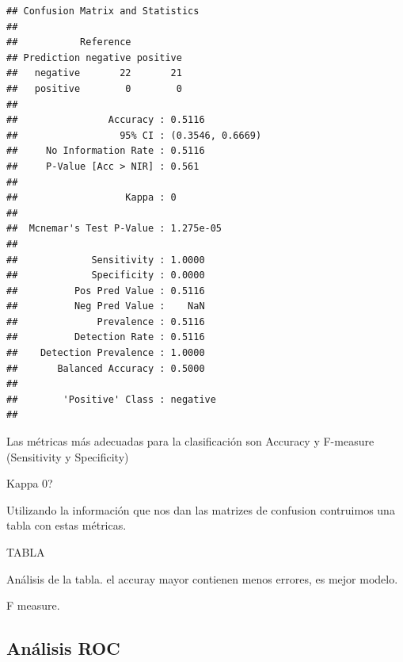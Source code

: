 \documentclass[]{article}
\newenvironment{Shaded}{\begin{snugshade}}{\end{snugshade}}
\newcommand{\DataTypeTok}[1]{\textcolor[rgb]{0.13,0.29,0.53}{#1}}
\newcommand{\KeywordTok}[1]{\textcolor[rgb]{0.13,0.29,0.53}{\textbf{#1}}}
\newcommand{\NormalTok}[1]{#1}
\newcommand{\OperatorTok}[1]{\textcolor[rgb]{0.81,0.36,0.00}{\textbf{#1}}}
\newcommand{\StringTok}[1]{\textcolor[rgb]{0.31,0.60,0.02}{#1}}
\begin{document}
\begin{Shaded}
\end{Shaded}

\begin{verbatim}
## Confusion Matrix and Statistics
## 
##           Reference
## Prediction negative positive
##   negative       22       21
##   positive        0        0
##                                           
##                Accuracy : 0.5116          
##                  95% CI : (0.3546, 0.6669)
##     No Information Rate : 0.5116          
##     P-Value [Acc > NIR] : 0.561           
##                                           
##                   Kappa : 0               
##                                           
##  Mcnemar's Test P-Value : 1.275e-05       
##                                           
##             Sensitivity : 1.0000          
##             Specificity : 0.0000          
##          Pos Pred Value : 0.5116          
##          Neg Pred Value :    NaN          
##              Prevalence : 0.5116          
##          Detection Rate : 0.5116          
##    Detection Prevalence : 1.0000          
##       Balanced Accuracy : 0.5000          
##                                           
##        'Positive' Class : negative        
## 
\end{verbatim}

Las métricas más adecuadas para la clasificación son Accuracy y
F-measure (Sensitivity y Specificity)

Kappa 0?

Utilizando la información que nos dan las matrizes de confusion
contruimos una tabla con estas métricas.

TABLA

Análisis de la tabla. el accuray mayor contienen menos errores, es mejor
modelo.

F measure.

\hypertarget{anuxe1lisis-roc}{%
\subsection{Análisis ROC}\label{anuxe1lisis-roc}}
\end{document}

